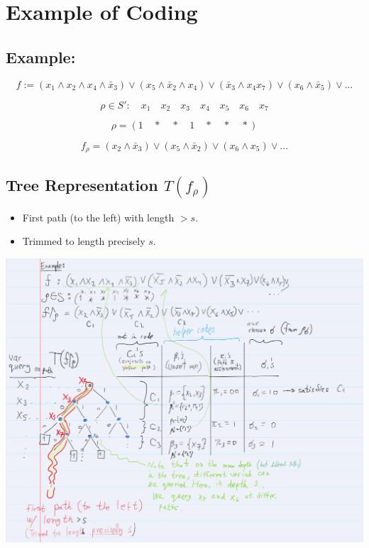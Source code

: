 \section*{Example of Coding}

\subsection*{Example:}
\[
f := (x_1 \wedge x_2 \wedge x_4 \wedge \bar{x}_3) \vee (x_5 \wedge \bar{x}_2 \wedge x_4) \vee (\bar{x}_3 \wedge x_4 x_7) \vee (x_6 \wedge \bar{x}_5) \vee \dots
\]

\[
\rho \in S' : \quad x_1 \quad x_2 \quad x_3 \quad x_4 \quad x_5 \quad x_6 \quad x_7
\]

\[
\rho = (1 \quad * \quad * \quad 1 \quad * \quad * \quad *)
\]

\[
f_{\rho} = (x_2 \wedge \bar{x}_3) \vee (x_5 \wedge \bar{x}_2) \vee (x_6 \wedge x_5) \vee \dots
\]

\subsection*{Tree Representation \(T(f_{\rho})\)}

\begin{itemize}
    \item First path (to the left) with length \( > s \).
    \item Trimmed to length precisely \( s \).
\end{itemize}



\includegraphics[width=\textwidth]{images/coding-sl-ex1.png}


